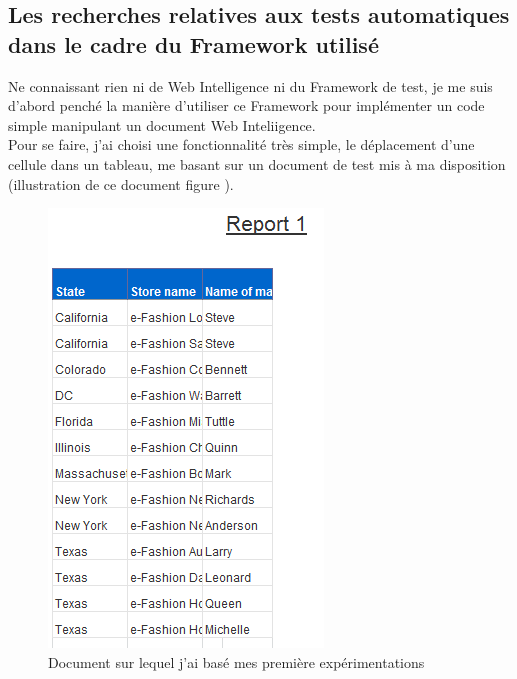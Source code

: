 \subsection{Les recherches relatives aux tests automatiques dans le cadre du \gls{Framework} utilis\'{e}}


Ne connaissant rien ni de Web Intelligence ni du \gls{Framework} de test, je me suis d'abord pench\'{e} la mani\`{e}re d'utiliser ce \gls{Framework} pour impl\'{e}menter un code simple manipulant un document Web Inteliigence.\\

Pour se faire, j'ai choisi une fonctionnalit\'{e} tr\`{e}s simple, le d\'{e}placement d'une cellule dans un tableau, me basant sur un document de test mis \`{a} ma disposition (illustration de ce document figure \pageref{figure:docsample}).\\

\begin{figure}[!h]
  \centering
      \includegraphics{images/docsample.png}
  \caption{Document sur lequel j'ai bas\'{e} mes premi\`{e}re exp\'{e}rimentations}
	\label{figure:docsample}
\end{figure}
 
